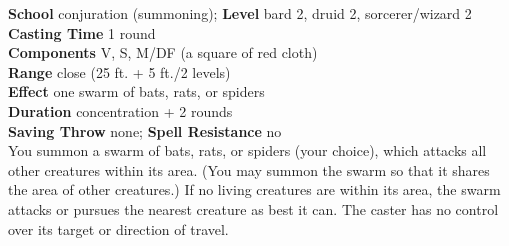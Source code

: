 \textbf{School} conjuration (summoning); \textbf{Level} bard 2, druid 2, sorcerer/wizard 2\\
\textbf{Casting Time} 1 round\\
\textbf{Components} V, S, M/DF (a square of red cloth)\\
\textbf{Range} close (25 ft. + 5 ft./2 levels)\\
\textbf{Effect} one swarm of bats, rats, or spiders\\
\textbf{Duration} concentration + 2 rounds\\
\textbf{Saving Throw} none; \textbf{Spell Resistance} no\\
You summon a swarm of bats, rats, or spiders (your choice), which attacks all other creatures within its area. (You may summon the swarm so that it shares the area of other creatures.) If no living creatures are within its area, the swarm attacks or pursues the nearest creature as best it can. The caster has no control over its target or direction of travel.\\
